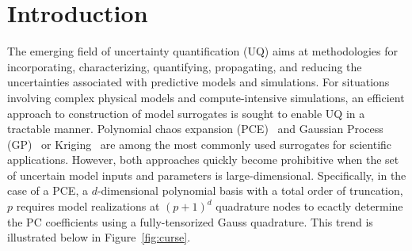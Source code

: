 \section{Introduction}
\label{sec:intro}


The emerging field of uncertainty quantification (UQ) aims at methodologies for 
incorporating, characterizing, quantifying, propagating, and reducing the 
uncertainties associated with predictive models and simulations. For situations
involving complex physical models and compute-intensive simulations, an
efficient approach to construction of model surrogates is sought to enable UQ
in a tractable manner. Polynomial chaos expansion 
(PCE)~\cite{Xiu:2002,Ghanem:2003,Eldred:2008,Olivier:2010} and 
Gaussian Process (GP)~\cite{Rasmussen:2004} or Kriging~\cite{Stein:2012} are
among the most commonly used surrogates for scientific applications. However,
both approaches quickly become prohibitive when the set of uncertain model
inputs and parameters is large-dimensional. Specifically, in the case of a PCE,
a $d$-dimensional polynomial basis with a total order of truncation, $p$ 
requires model realizations at $(p+1)^d$ quadrature nodes to ecactly determine the PC
coefficients using a fully-tensorized Gauss quadrature. This trend is 
illustrated below in Figure~\ref{fig:curse}.

